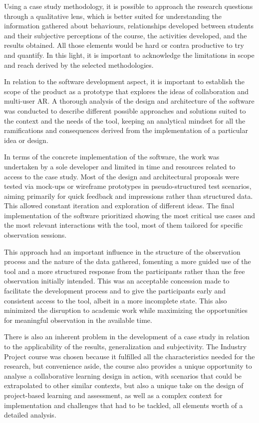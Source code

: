 Using a case study methodology, it is possible to approach the research questions through a qualitative lens, which is better suited for understanding the information gathered about
behaviours, relationships developed between students and their subjective perceptions of the course, the activities developed, and the results obtained. All those elements would be
hard or contra productive to try and quantify. In this light, it is important to acknowledge the limitations in scope and reach derived by the selected methodologies.

In relation to the software development aspect, it is important to establish the scope of the product as a prototype that explores the ideas of collaboration and multi-user \ac{AR}. A
thorough analysis of the design and architecture of the software was conducted to describe different possible approaches and solutions suited to the context and the needs of the tool,
keeping an analytical mindset for all the ramifications and consequences derived from the implementation of a particular idea or design.

In terms of the concrete implementation of the software, the work was undertaken by a sole developer and limited in time and resources related to access to the case study. Most of the
design and architectural proposals were tested via mock-ups or wireframe prototypes \parencite{coleman_2017,sutipitakwong_2020} in pseudo-structured test scenarios, aiming primarily for
quick feedback and impressions rather than structured data. This allowed constant iteration and exploration of different ideas. The final implementation of the software prioritized
showing the most critical use cases and the most relevant interactions with the tool, most of them tailored for specific observation sessions.

This approach had an important influence in the structure of the observation process and the nature of the data gathered, fomenting a more guided use of the tool and a more structured
response from the participants rather than the free observation initially intended. This was an acceptable concession made to facilitate the development process and to give the
participants early and consistent access to the tool, albeit in a more incomplete state. This also minimized the disruption to academic work while maximizing the opportunities for
meaningful observation in the available time.

There is also an inherent problem in the development of a case study in relation to the applicability of the results, generalization and subjectivity. The Industry Project course was
chosen because it fulfilled all the characteristics needed for the research, but convenience aside, the course also provides a unique opportunity to analyse a collaborative learning
design in action, with scenarios that could be extrapolated to other similar contexts, but also a unique take on the design of project-based learning and assessment, as well as a complex
context for implementation and challenges that had to be tackled, all elements worth of a detailed analysis.

